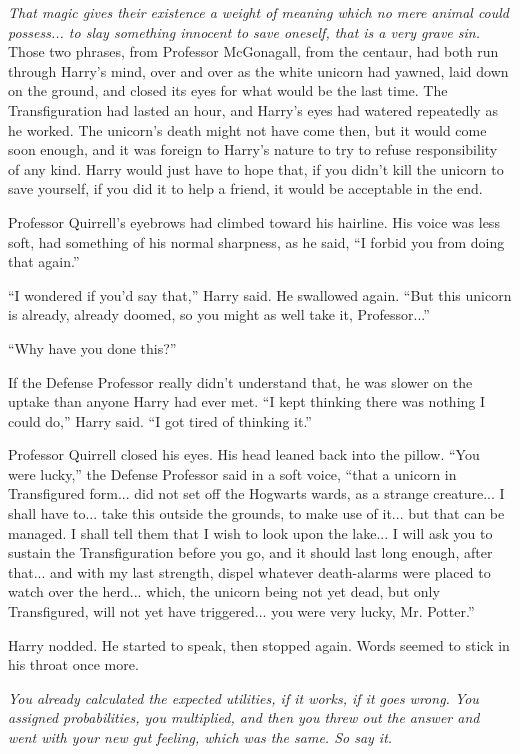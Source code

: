 \emph{That magic gives their existence a weight of meaning which no mere animal could possess... to slay something innocent to save oneself, that is a very grave sin.} Those two phrases, from Professor McGonagall, from the centaur, had both run through Harry's mind, over and over as the white unicorn had yawned, laid down on the ground, and closed its eyes for what would be the last time. The Transfiguration had lasted an hour, and Harry's eyes had watered repeatedly as he worked. The unicorn's death might not have come then, but it would come soon enough, and it was foreign to Harry's nature to try to refuse responsibility of any kind. Harry would just have to hope that, if you didn't kill the unicorn to save yourself, if you did it to help a friend, it would be acceptable in the end.

Professor Quirrell's eyebrows had climbed toward his hairline. His voice was less soft, had something of his normal sharpness, as he said, ``I forbid you from doing that again.''

``I wondered if you'd say that,'' Harry said. He swallowed again. ``But this unicorn is already, already doomed, so you might as well take it, Professor...''

``Why have you done this?''

If the Defense Professor really didn't understand that, he was slower on the uptake than anyone Harry had ever met. ``I kept thinking there was nothing I could do,'' Harry said. ``I got tired of thinking it.''

Professor Quirrell closed his eyes. His head leaned back into the pillow. ``You were lucky,'' the Defense Professor said in a soft voice, ``that a unicorn in Transfigured form... did not set off the Hogwarts wards, as a strange creature... I shall have to... take this outside the grounds, to make use of it... but that can be managed. I shall tell them that I wish to look upon the lake... I will ask you to sustain the Transfiguration before you go, and it should last long enough, after that... and with my last strength, dispel whatever death-alarms were placed to watch over the herd... which, the unicorn being not yet dead, but only Transfigured, will not yet have triggered... you were very lucky, Mr. Potter.''

Harry nodded. He started to speak, then stopped again. Words seemed to stick in his throat once more.

\emph{You already calculated the expected utilities, if it works, if it goes wrong. You assigned probabilities, you multiplied, and then you threw out the answer and went with your new gut feeling, which was the same. So say it.}

